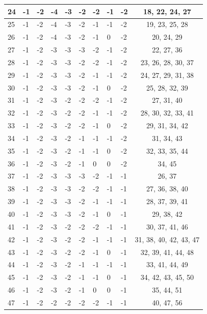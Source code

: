 \begin{longtable}{|l|l|l|l|l|l|l|l|l|c|}
24 & -1 & -2 & -4 & -3 & -2 & -2 & -1 & -2 & 18, 22, 24, 27 \\ \hline
25 & -1 & -2 & -4 & -3 & -2 & -1 & -1 & -2 & 19, 23, 25, 28 \\ \hline
26 & -1 & -2 & -4 & -3 & -2 & -1 & 0 & -2 & 20, 24, 29 \\ \hline
27 & -1 & -2 & -3 & -3 & -3 & -2 & -1 & -2 & 22, 27, 36 \\ \hline
28 & -1 & -2 & -3 & -3 & -2 & -2 & -1 & -2 & 23, 26, 28, 30, 37 \\ \hline
29 & -1 & -2 & -3 & -3 & -2 & -1 & -1 & -2 & 24, 27, 29, 31, 38 \\ \hline
30 & -1 & -2 & -3 & -3 & -2 & -1 & 0 & -2 & 25, 28, 32, 39 \\ \hline
31 & -1 & -2 & -3 & -2 & -2 & -2 & -1 & -2 & 27, 31, 40 \\ \hline
32 & -1 & -2 & -3 & -2 & -2 & -1 & -1 & -2 & 28, 30, 32, 33, 41 \\ \hline
33 & -1 & -2 & -3 & -2 & -2 & -1 & 0 & -2 & 29, 31, 34, 42 \\ \hline
34 & -1 & -2 & -3 & -2 & -1 & -1 & -1 & -2 & 31, 34, 43 \\ \hline
35 & -1 & -2 & -3 & -2 & -1 & -1 & 0 & -2 & 32, 33, 35, 44 \\ \hline
36 & -1 & -2 & -3 & -2 & -1 & 0 & 0 & -2 & 34, 45 \\ \hline
37 & -1 & -2 & -3 & -3 & -3 & -2 & -1 & -1 & 26, 37 \\ \hline
38 & -1 & -2 & -3 & -3 & -2 & -2 & -1 & -1 & 27, 36, 38, 40 \\ \hline
39 & -1 & -2 & -3 & -3 & -2 & -1 & -1 & -1 & 28, 37, 39, 41 \\ \hline
40 & -1 & -2 & -3 & -3 & -2 & -1 & 0 & -1 & 29, 38, 42 \\ \hline
41 & -1 & -2 & -3 & -2 & -2 & -2 & -1 & -1 & 30, 37, 41, 46 \\ \hline
42 & -1 & -2 & -3 & -2 & -2 & -1 & -1 & -1 & 31, 38, 40, 42, 43, 47 \\ \hline
43 & -1 & -2 & -3 & -2 & -2 & -1 & 0 & -1 & 32, 39, 41, 44, 48 \\ \hline
44 & -1 & -2 & -3 & -2 & -1 & -1 & -1 & -1 & 33, 41, 44, 49 \\ \hline
45 & -1 & -2 & -3 & -2 & -1 & -1 & 0 & -1 & 34, 42, 43, 45, 50 \\ \hline
46 & -1 & -2 & -3 & -2 & -1 & 0 & 0 & -1 & 35, 44, 51 \\ \hline
47 & -1 & -2 & -2 & -2 & -2 & -2 & -1 & -1 & 40, 47, 56 \\ \hline

\end{longtable}
